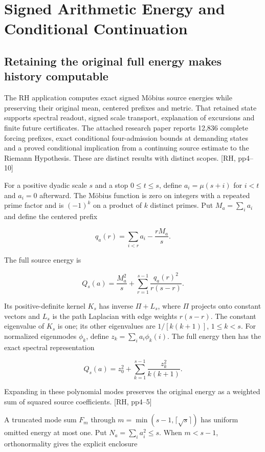 \chapter{Signed Arithmetic Energy and Conditional Continuation}\label{signed-arithmetic-energy-and-conditional-continuation}

\section{Retaining the original full energy makes history computable}\label{retaining-the-original-full-energy-makes-history-computable}

The RH application computes exact signed Möbius source energies while preserving their original mean, centered prefixes and metric. That retained state supports spectral readout, signed scale transport, explanation of excursions and finite future certificates. The attached research paper reports 12,836 complete forcing prefixes, exact conditional four-admission bounds at demanding states and a proved conditional implication from a continuing source estimate to the Riemann Hypothesis. These are distinct results with distinct scopes. {[}RH, pp4--10{]}

For a positive dyadic scale \(s\) and a stop \(0\le t\le s\), define \(a_i=\mu(s+i)\) for \(i<t\) and \(a_i=0\) afterward. The Möbius function is zero on integers with a repeated prime factor and is \((-1)^k\) on a product of \(k\) distinct primes. Put \(M_a=\sum_i a_i\) and define the centered prefix

\[
q_a(r)=\sum_{i<r}a_i-\frac{rM_a}{s}.
\]

The full source energy is

\[
Q_s(a)=\frac{M_a^2}{s}+\sum_{r=1}^{s-1}\frac{q_a(r)^2}{r(s-r)}.
\]

Its positive-definite kernel \(K_s\) has inverse \(\Pi+L_s\), where \(\Pi\) projects onto constant vectors and \(L_s\) is the path Laplacian with edge weights \(r(s-r)\). The constant eigenvalue of \(K_s\) is one; its other eigenvalues are \(1/[k(k+1)]\), \(1\le k<s\). For normalized eigenmodes \(\phi_k\), define \(z_k=\sum_i a_i\phi_k(i)\). The full energy then has the exact spectral representation

\[
Q_s(a)=z_0^2+\sum_{k=1}^{s-1}\frac{z_k^2}{k(k+1)}.
\]

Expanding in these polynomial modes preserves the original energy as a weighted sum of squared source coefficients. {[}RH, pp4--5{]}

A truncated mode sum \(F_m\) through \(m=\min(s-1,\lceil\sqrt s\rceil)\) has uniform omitted energy at most one. Put \(N_a=\sum_i a_i^2\le s\). When \(m<s-1\), orthonormality gives the explicit enclosure

